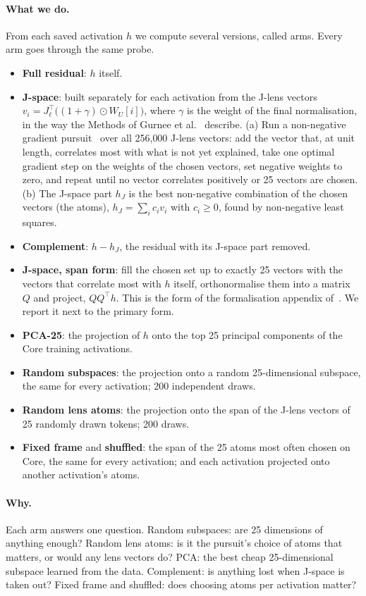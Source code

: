 \documentclass[11pt]{article}
\begin{document}
\paragraph{What we do.} From each saved activation $h$ we compute several versions, called arms. Every arm goes through the
same probe.
\begin{itemize}
\item \textbf{Full residual}: $h$ itself.
\item \textbf{J-space}: built separately for each activation from the J-lens vectors
$v_i = J_\ell^{\top}\big((1+\gamma)\odot W_U[i]\big)$, where $\gamma$ is the weight of the final normalisation, in the way
the Methods of Gurnee et al.~\cite{gurnee2026workspace} describe. (a) Run a non-negative gradient
pursuit~\cite{blumensath2008} over all 256{,}000 J-lens vectors: add the vector that, at unit length, correlates most with
what is not yet explained, take one optimal gradient step on the weights of the chosen vectors, set negative weights to
zero, and repeat until no vector correlates positively or 25 vectors are chosen. (b) The J-space part $h_J$ is the best
non-negative combination of the chosen vectors (the atoms), $h_J=\sum_i c_i v_i$ with $c_i\ge 0$, found by non-negative
least squares.
\item \textbf{Complement}: $h - h_J$, the residual with its J-space part removed.
\item \textbf{J-space, span form}: fill the chosen set up to exactly 25 vectors with the vectors that correlate most with
$h$ itself, orthonormalise them into a matrix $Q$ and project, $QQ^{\top}h$. This is the form of the formalisation appendix
of~\cite{gurnee2026workspace}. We report it next to the primary form.
\item \textbf{PCA-25}: the projection of $h$ onto the top 25 principal components of the Core training activations.
\item \textbf{Random subspaces}: the projection onto a random 25-dimensional subspace, the same for every activation; 200
independent draws.
\item \textbf{Random lens atoms}: the projection onto the span of the J-lens vectors of 25 randomly drawn tokens; 200 draws.
\item \textbf{Fixed frame} and \textbf{shuffled}: the span of the 25 atoms most often chosen on Core, the same for every
activation; and each activation projected onto another activation's atoms.
\end{itemize}

\paragraph{Why.} Each arm answers one question. Random subspaces: are 25 dimensions of anything enough? Random lens atoms:
is it the pursuit's choice of atoms that matters, or would any lens vectors do? PCA: the best cheap 25-dimensional subspace
learned from the data. Complement: is anything lost when J-space is taken out? Fixed frame and shuffled: does choosing
atoms per activation matter?
\end{document}
